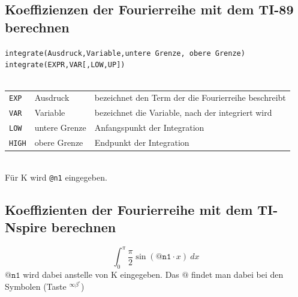 \ifti
\subsection{Koeffizienzen der Fourierreihe mit dem TI-89 berechnen}
\verb?integrate(Ausdruck,Variable,untere Grenze, obere Grenze)? \\
\verb?integrate(EXPR,VAR[,LOW,UP])? \\\\
\begin{tabular}{@{}lll}
\verb?EXP?  & Ausdruck      & bezeichnet den Term der die Fourierreihe beschreibt \\
\verb?VAR?  & Variable      & bezeichnet die Variable, nach der integriert wird \\
\verb?LOW?  & untere Grenze & Anfangspunkt der Integration \\
\verb?HIGH? & obere Grenze  & Endpunkt der Integration \\
\end{tabular}\\
Für K wird \verb?@n1? eingegeben. 
\fi
\ifnspire
\subsection{Koeffizienten der Fourierreihe mit dem TI-Nspire berechnen}
\[ \int_{\boxed{0}}^{\boxed{\pi}}\boxed{\frac{\pi}{2}\sin(\mathtt{@n1} \cdot x)}~d\boxed{x} \]
$\mathtt{@n1}$ wird dabei anstelle von K eingegeben. Das $\mathtt{@}$ findet man dabei bei den Symbolen (Taste $\boxed{\boxed{^{\infty \beta ^\circ}}}$)
\fi
